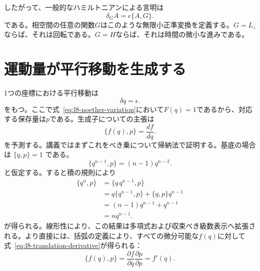 したがって、一般的なハミルトニアンによる言明は
\begin{equation}
  \boxed{\delta_G A=\epsilon\{A,G\}.}
  \label{eq:l8-generator-rule}
\end{equation}
である。相空間の任意の関数\(G\)はこのような無限小正準変換を定義する。\(G=L_z\)ならば、それは回転である。\(G=H\)ならば、それは時間の微小な進みである。

\begin{classroomqa}
\end{classroomqa}

\section{運動量が平行移動を生成する}

1つの座標における平行移動は
\begin{equation}
  \delta q=\epsilon.
  \label{eq:l8-q-translation}
\end{equation}
をもつ。ここで式~\eqref{eq:l8-noether-variation}において\(F(q)=1\)であるから、対応する保存量は\(p\)である。生成子についての主張は
\begin{equation}
  \{f(q),p\}=\frac{df}{dq}.
  \label{eq:l8-translation-derivative}
\end{equation}
を予測する。講義ではまずこれをべき乗について帰納法で証明する。基底の場合は
\(\{q,p\}=1\)
である。
\begin{equation}
  \{q^{n-1},p\}=(n-1)q^{n-2}.
  \label{eq:l8-induction-hypothesis}
\end{equation}
と仮定する。すると積の規則により
\begin{align}
  \{q^n,p\}
  &=\{q\,q^{n-1},p\}\\
  &=q\{q^{n-1},p\}+\{q,p\}q^{n-1}\\
  &=(n-1)q^{n-1}+q^{n-1}\\
  &=nq^{n-1}.
  \label{eq:l8-power-translation}
\end{align}
が得られる。線形性により、この結果は多項式および収束べき級数表示へ拡張される。より直接には、括弧の定義により、すべての微分可能な\(f(q)\)に対して式~\eqref{eq:l8-translation-derivative}が得られる：
\begin{equation}
  \{f(q),p\}
  =
  \frac{\partial f}{\partial q}
  \frac{\partial p}{\partial p}
  =f'(q).
\end{equation}

